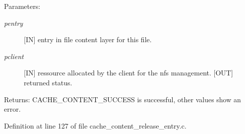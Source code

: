 \begin{Desc}
\item[Parameters:]
\begin{description}
\item[{\em pentry}][IN] entry in file content layer for this file. \item[{\em pclient}][IN] ressource allocated by the client for the nfs management.  [OUT] returned status.\end{description}
\end{Desc}
\begin{Desc}
\item[Returns:]CACHE\_\-CONTENT\_\-SUCCESS is successful, other values show an error. \end{Desc}


Definition at line 127 of file cache\_\-content\_\-release\_\-entry.c.